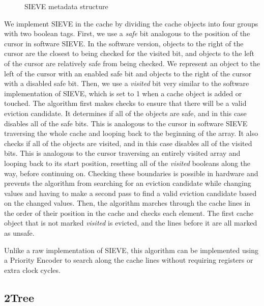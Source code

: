 \documentclass[letterpaper]{article}
\begin{document}
\begin{figure}
	\begin{center}
	\end{center}
	\caption{SIEVE metadata structure}
	\label{fig:sieve}
\end{figure}


We implement SIEVE in the cache by dividing the cache objects into four groups with two boolean tags.
First, we use a \textit{safe} bit analogous to the position of the cursor in software SIEVE.
In the software version, objects to the right of the cursor are the closest to being checked for the visited bit,
and objects to the left of the cursor are relatively safe from being checked.
We represent an object to the left of the cursor with an enabled safe bit
and objects to the right of the cursor with a disabled safe bit.
Then, we use a \textit{visited} bit very similar to the software implementation of SIEVE,
which is set to 1 when a cache object is added or touched.
The algorithm first makes checks to ensure that there will be a valid eviction candidate.
It determines if all of the objects are safe,
and in this case disables all of the safe bits.
This is analogous to the cursor in software SIEVE traversing the whole cache and looping back to the beginning of the array.
It also checks if all of the objects are visited,
and in this case disables all of the visited bits.
This is analogous to the cursor traversing an entirely visited array and looping back to its start position,
resetting all of the \textit{visited} booleans along the way,
before continuing on.
Checking these boundaries is possible in hardware and prevents the algorithm from
searching for an eviction candidate while changing values
and having to make a second pass to find a valid eviction candidate based on the changed values.
Then, the algorithm marches through the cache lines in the order of their position in the cache
and checks each element.
The first cache object that is not marked \textit{visited} is evicted,
and the lines before it are all marked as unsafe.

Unlike a raw implementation of SIEVE, this algorithm can be implemented using a Priority Encoder
to search along the cache lines without requiring registers or extra clock cycles.

\subsection{2Tree}
\end{document}
